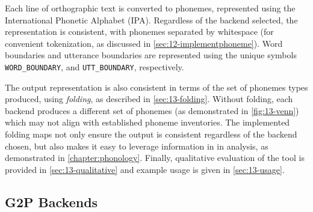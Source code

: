 Each line of orthographic text is converted to phonemes, represented using the International Phonetic Alphabet (IPA). Regardless of the backend selected, the representation is consistent, with phonemes separated by whitespace (for convenient tokenization, as discussed in \cref{sec:12-implementphoneme}). Word boundaries and utterance boundaries are represented using the unique symbols \texttt{WORD\_BOUNDARY}, and \texttt{UTT\_BOUNDARY}, respectively. 

The output representation is also consistent in terms of the set of phonemes types produced, using \emph{folding}, as described in \cref{sec:13-folding}. Without folding, each backend produces a different set of phonemes (as demonstrated in \cref{fig:13-venn}) which may not align with established phoneme inventories. The implemented folding maps not only ensure the output is consistent regardless of the backend chosen, but also makes it easy to leverage information in \phoible in analysis, as demonstrated in \cref{chapter:phonology}. Finally, qualitative evaluation of the tool is provided in \cref{sec:13-qualitative} and example usage is given in \cref{sec:13-usage}.





\subsection{G2P Backends}\label{sec:13-backends}

